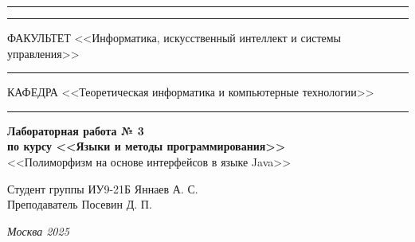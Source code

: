 \documentclass[a4paper, 14pt]{extarticle}
\begin{document}
\begin{titlepage}
\vspace{-25pt}
\hspace{-35pt}\rule{\textwidth}{2.3pt}

\vspace*{-20.3pt}
\hspace{-35pt}\rule{\textwidth}{0.4pt}

\vspace{1.5ex}
\hspace{-35pt} \noindent \small ФАКУЛЬТЕТ\hspace{30pt} <<Информатика, искусственный интеллект и системы управления>>

\vspace*{-16pt}
\hspace{47pt}\rule{0.83\textwidth}{0.4pt}

\vspace{0.5ex}
\hspace{-35pt} \noindent \small КАФЕДРА\hspace{50pt} <<Теоретическая информатика и компьютерные технологии>>

\vspace*{-16pt}
\hspace{30pt}\rule{0.866\textwidth}{0.4pt}

\vspace{11em}

\begin{center}
\Large {\bf Лабораторная работа № 3} \\
\large {\bf по курсу <<Языки и методы программирования>>} \\
\large <<Полиморфизм на основе интерфейсов в языке Java>>
\end{center}\normalsize

\vspace{8em}


\begin{flushright}
  {Студент группы ИУ9-21Б Яннаев А. С. \hspace*{15pt}\\
  \vspace{2ex}
  Преподаватель Посевин Д. П.\hspace*{15pt}}
\end{flushright}

\bigskip

\vfill


\begin{center}
\textsl{Москва 2025}
\end{center}
\end{titlepage}
\end{document}
